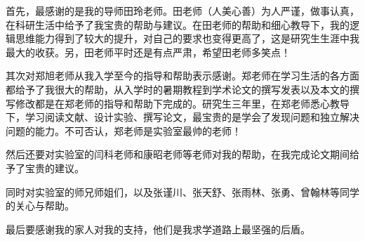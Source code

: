 \documentclass[master]{thesis-uestc}
\begin{document}
首先，最感谢的是我的导师田玲老师。田老师（人美心善）为人严谨，做事认真，在科研生活中给予了我宝贵的帮助与建议。在田老师的帮助和细心教导下，我的逻辑思维能力得到了较大的提升，对自己的要求也变得更高了，这是研究生生涯中我最大的收获。另，田老师平时还是有点严肃，希望田老师多笑点！

其次对郑旭老师从我入学至今的指导和帮助表示感谢。郑老师在学习生活的各方面都给予了我很大的帮助，从入学时的暑期教程到学术论文的撰写发表以及本文的撰写修改都是在郑老师的指导和帮助下完成的。研究生三年里，在郑老师悉心教导下，学习阅读文献、设计实验、撰写论文，最宝贵的是学会了发现问题和独立解决问题的能力。不可否认，郑老师是实验室最帅的老师！

然后还要对实验室的闫科老师和康昭老师等老师对我的帮助，在我完成论文期间给予了宝贵的建议。

同时对实验室的师兄师姐们，以及张谨川、张天舒、张雨林、张勇、曾翰林等同学的关心与帮助。

最后要感谢我的家人对我的支持，他们是我求学道路上最坚强的后盾。
\thesisappendix



%
% 
%
% 
% 
%

\end{document}
